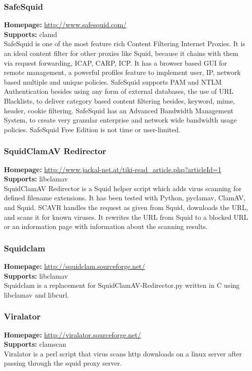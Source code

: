 \documentclass[a4paper,titlepage,12pt]{article}
\begin{document}
    \subsubsection{SafeSquid}
    \textbf{Homepage:} \url{http://www.safesquid.com/}\\
    \textbf{Supports:} clamd\\[4pt]
    SafeSquid is one of the most feature rich Content Filtering Internet
    Proxies. It is an ideal content filter for other proxies like Squid,
    because it chains with them via request forwarding, ICAP, CARP, ICP. It
    has a browser based GUI for remote management, a powerful profiles feature
    to implement user, IP, network based multiple and unique policies.
    SafeSquid supports PAM and NTLM Authentication besides using any form of
    external databases, the use of URL Blacklists, to deliver category based
    content filtering besides, keyword, mime, header, cookie filtering.
    SafeSquid has an Advanced Bandwidth Management System, to create very
    granular enterprise and network wide bandwidth usage policies. SafeSquid
    Free Edition is not time or user-limited.

    \subsubsection{SquidClamAV Redirector}
    \textbf{Homepage:} \url{http://www.jackal-net.at/tiki-read_article.php?articleId=1}\\
    \textbf{Supports:} libclamav\\[4pt]
    SquidClamAV Redirector is a Squid helper script which adds virus scanning
    for defined filename extensions. It has been tested with Python, pyclamav,
    ClamAV, and Squid. SCAVR handles the request as given from Squid, downloads
    the URL, and scans it for known viruses. It rewrites the URL from Squid to
    a blocked URL or an information page with information about the scanning
    results.

    \subsubsection{Squidclam}
    \textbf{Homepage:} \url{http://squidclam.sourceforge.net/}\\
    \textbf{Supports:} libclamav\\[4pt]
    Squidclam is a replacement for SquidClamAV-Redirector.py written in C
    using libclamav and libcurl.

    \subsubsection{Viralator}
    \textbf{Homepage:} \url{http://viralator.sourceforge.net/}\\
    \textbf{Supports:} clamscan\\[4pt]
    Viralator is a perl script that virus scans http downloads on a linux
    server after passing through the squid proxy server.
\end{document}
